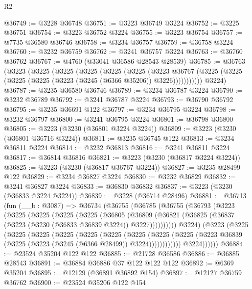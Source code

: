 \begin{lexlean}{R2}
\begin{coremodule}
@36749 := @3228 @36748
@36751 := @3223 @36749 @3224
@36752 := @3225 @36751
@36754 := @3223 @36752 @3224
@36755 := @3223 @36754
@36757 := @7735 @36580 @36746
@36758 := @3234 @36757
@36759 := @36758 @3224
@36760 := @3232 @36759
@36762 := @3241 @36757 @3224
@36763 := @36760 @36762
@36767 := @4760 (@33041 @36586 @28543 @28539)
@36785 := @36763
    (@3223
      (@3225
        (@3225
          (@3225
            (@3225
              (@3225
                (@3223
                  @36767
                  (@3225 (@3225 (@3225 (@3225 (@3223 (@3245 (@6366 @35206)) @3226)))))))))))
      @3224)
@36787 := @3235 @36580 @36746
@36789 := @3234 @36787 @3224
@36790 := @3232 @36789
@36792 := @3241 @36787 @3224
@36793 := @36790 @36792
@36795 := @3235 @36691 @122
@36797 := @3234 @36795 @3224
@36798 := @3232 @36797
@36800 := @3241 @36795 @3224
@36801 := @36798 @36800
@36805 := @3223 (@3230 (@36801 @3224 @3224))
@36809 := @3223 (@3230 (@36801 @36716 @3224))
@36811 := @3235 @36745 @122
@36813 := @3234 @36811 @3224
@36814 := @3232 @36813
@36816 := @3241 @36811 @3224
@36817 := @36814 @36816
@36821 := @3223 (@3230 (@36817 @3224 @3224))
@36825 := @3223 (@3230 (@36817 @36767 @3224))
@36827 := @3235 @28499 @122
@36829 := @3234 @36827 @3224
@36830 := @3232 @36829
@36832 := @3241 @36827 @3224
@36833 := @36830 @36832
@36837 := @3223 (@3230 (@36833 @3224 @3224))
@36839 := @3228 (@36714 @28496)
@36881 := @36713
    (fun (__b : @3087) =>
    @36734
      (@36755
        (@36785
          (@36755
            (@36793
              (@3223
                (@3225
                  (@3225
                    (@3225
                      (@3225
                        (@36805
                          (@36809
                            (@36821
                              (@36825 (@36837 (@3223 (@3230 (@36833 @36839 @3224)) @3227))))))))))
                @3224)
              (@3223
                (@3225
                  (@3225
                    (@3225
                      (@3225
                        (@3225
                          (@3225
                            (@3225
                              (@3225
                                (@3225
                                  (@3223
                                    @36839
                                    (@3225 (@3223 (@3245 (@6366 @28499)) @3224))))))))))))
                @3224))))))
@36884 := @23524 @35204 @122 @122
@36885 := @21728 @36586
@36886 := @36885 @28543
@36891 := @36884 @36886 @37 @122 @122 @122
@36892 := @6369 @35204
@36895 := @12129 (@36891 @36892 @154)
@36897 := @12127 @36759 @36762
@36900 := @23524 @35206 @122 @154

\end{coremodule}
\end{lexlean}

